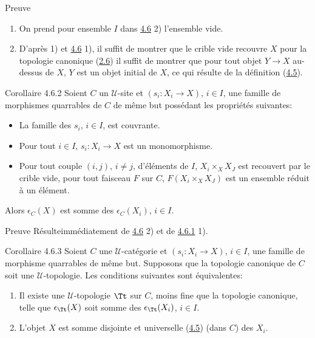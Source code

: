 \begin{enonce*}[remark]{Preuve}
\begin{enumerate}
\renewcommand{\labelenumi}{\theenumi)}
\item On prend pour ensemble $I$ dans \hyperref[II.prop4.6]{4.6} 2) l'ensemble vide.

\item D'après 1) et \hyperref[II.prop4.6]{4.6} 1), il suffit de montrer que le crible vide
  recouvre $X$ pour la topologie canonique \ie (\hyperref[II.prop2.6]{2.6}) il suffit de
  montrer que pour tout objet $Y\rightarrow X$ au-dessus de $X$, $Y$
  est un objet initial de $X$, ce qui résulte de la définition (\hyperref[II.def4.5]{4.5}).
\end{enumerate}
\end{enonce*}

\begin{enonce*}{Corollaire 4.6.2}
Soient $C$ un $𝒰$-site et $(s_i:X_i\rightarrow X)$, $i\in
I$, une famille de morphismes quarrables de $C$ de même but
possédant les propriétés suivantes:
\begin{itemize}
\item[$\alpha)$] La famille des $s_i$, $i\in I$, est couvrante.

\item[$\beta)$] Pour tout $i\in I$, $s_i:X_i\rightarrow X$ est un
  monomorphisme.

\item[$\gamma)$] Pour tout couple $(i,j)$, $i\neq j$, d'éléments
  de $I$, $X_i\times_X X_J$ est recouvert par le crible vide, \ie pour
  tout faisceau $F$ sur $C$, $F(X_i\times_X X_J)$ est un ensemble
  réduit à un élément.
\end{itemize}
Alors $\epsilon_C(X)$ est somme des $\epsilon_C(X_i)$, $i\in I$.
\end{enonce*}

\begin{enonce*}[remark]{Preuve}
Résulte\pageoriginale immédiatement de \hyperref[II.prop4.6]{4.6} 2) et de
\hyperref[II.cor4.6.1]{4.6.1} 1).
\end{enonce*}

\begin{enonce*}{Corollaire 4.6.3}
Soient $C$ une $𝒰$-catégorie et $(s_i:X_i\rightarrow X)$,
$i\in I$, une famille de morphisme quarrables de même but.
Supposons que la topologie canonique de $C$ soit une
$𝒰$-topologie. Les conditions suivantes sont équivalentes:
\begin{enumerate}
\renewcommand{\theenumi}{\roman{enumi}}
\renewcommand{\labelenumi}{\theenumi)}
\item Il existe une $𝒰$-topologie $\Tt$ sur $C$, moins
  fine que la topologie canonique, telle que
  $\epsilon_{\Tt}(X)$ soit somme des
  $\epsilon_{\Tt}(X_i)$, $i\in I$.

\item L'objet $X$ est somme disjointe et universelle (\hyperref[II.def4.5]{4.5}) (dans
  $C$) des $X_i$.
\end{enumerate}
\end{enonce*}

